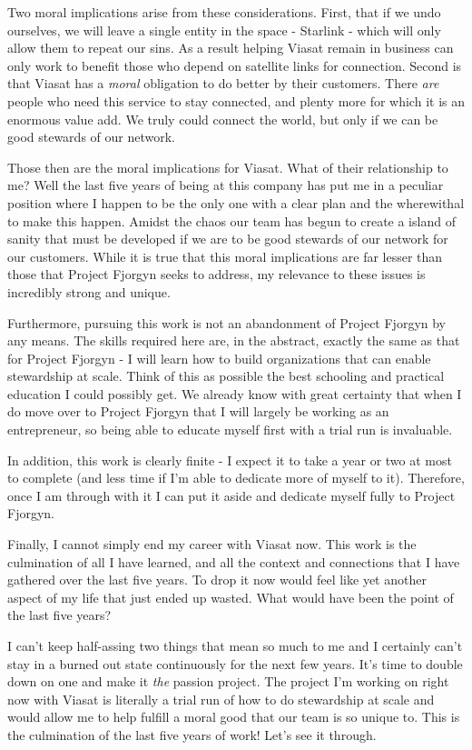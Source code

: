 \documentclass[10pt,a5paper]{book}
\begin{document}
Two moral implications arise from these considerations. First, that if we undo ourselves, we will leave a single entity in the space - Starlink - which will only allow them to repeat our sins. As a result helping Viasat remain in business can only work to benefit those who depend on satellite links for connection. Second is that Viasat has a \textit{moral} obligation to do better by their customers. There \textit{are} people who need this service to stay connected, and plenty more for which it is an enormous value add. We truly could connect the world, but only if we can be good stewards of our network. 

Those then are the moral implications for Viasat. What of their relationship to me? Well the last five years of being at this company has put me in a peculiar position where I happen to be the only one with a clear plan and the wherewithal to make this happen. Amidst the chaos our team has begun to create a island of sanity that must be developed if we are to be good stewards of our network for our customers. While it is true that this moral implications are far lesser than those that Project Fjorgyn seeks to address, my relevance to these issues is incredibly strong and unique. 

Furthermore, pursuing this work is not an abandonment of Project Fjorgyn by any means. The skills required here are, in the abstract, exactly the same as that for Project Fjorgyn - I will learn how to build organizations that can enable stewardship at scale. Think of this as possible the best schooling and practical education I could possibly get. We already know with great certainty that when I do move over to Project Fjorgyn that I will largely be working as an entrepreneur, so being able to educate myself first with a trial run is invaluable. 

In addition, this work is clearly finite - I expect it to take a year or two at most to complete (and less time if I'm able to dedicate more of myself to it). Therefore, once I am through with it I can put it aside and dedicate myself fully to Project Fjorgyn. 

Finally, I cannot simply end my career with Viasat now. This work is the culmination of all I have learned, and all the context and connections that I have gathered over the last five years. To drop it now would feel like yet another aspect of my life that just ended up wasted. What would have been the point of the last five years?

I can't keep half-assing two things that mean so much to me and I certainly can't stay in a burned out state continuously for the next few years. It's time to double down on one and make it \textit{the} passion project. The project I'm working on right now with Viasat is literally a trial run of how to do stewardship at scale and would allow me to help fulfill a moral good that our team is so unique to. This is the culmination of the last five years of work! Let's see it through.
\linebreak
\end{document}
